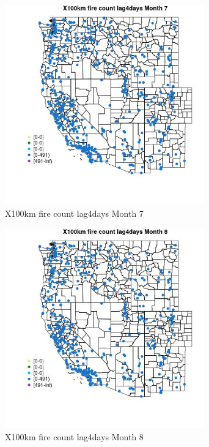 \begin{figure} 
\centering  
\includegraphics[width=0.77\textwidth]{Code_Outputs/Report_ML_input_PM25_Step4_part_e_de_duplicated_aves_compiled_2019-05-14wNAs_MapObsMo7X100km_fire_count_lag4days.jpg} 
\caption{\label{fig:Report_ML_input_PM25_Step4_part_e_de_duplicated_aves_compiled_2019-05-14wNAsMapObsMo7X100km_fire_count_lag4days}X100km fire count lag4days Month 7} 
\end{figure} 
 

\begin{figure} 
\centering  
\includegraphics[width=0.77\textwidth]{Code_Outputs/Report_ML_input_PM25_Step4_part_e_de_duplicated_aves_compiled_2019-05-14wNAs_MapObsMo8X100km_fire_count_lag4days.jpg} 
\caption{\label{fig:Report_ML_input_PM25_Step4_part_e_de_duplicated_aves_compiled_2019-05-14wNAsMapObsMo8X100km_fire_count_lag4days}X100km fire count lag4days Month 8} 
\end{figure} 
 

